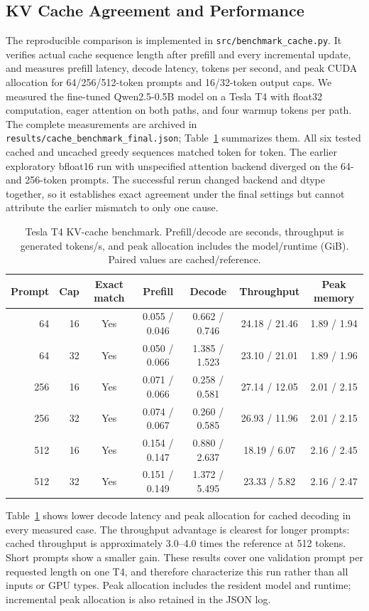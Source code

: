 \documentclass[conference]{IEEEtran}
\begin{document}
\subsection{KV Cache Agreement and Performance}
The reproducible comparison is implemented in \texttt{src/benchmark\_cache.py}. It verifies actual cache sequence length after prefill and every incremental update, and measures prefill latency, decode latency, tokens per second, and peak CUDA allocation for 64/256/512-token prompts and 16/32-token output caps. We measured the fine-tuned Qwen2.5-0.5B model on a Tesla T4 with float32 computation, eager attention on both paths, and four warmup tokens per path. The complete measurements are archived in \texttt{results/cache\_benchmark\_final.json}; Table~\ref{tab:cache-final} summarizes them. All six tested cached and uncached greedy sequences matched token for token. The earlier exploratory bfloat16 run with unspecified attention backend diverged on the 64- and 256-token prompts. The successful rerun changed backend and dtype together, so it establishes exact agreement under the final settings but cannot attribute the earlier mismatch to only one cause.

\begin{table}[t]
\centering
\caption{Tesla T4 KV-cache benchmark. Prefill/decode are seconds, throughput is generated tokens/s, and peak allocation includes the model/runtime (GiB). Paired values are cached/reference.}
\label{tab:cache-final}
\small
\begin{tabular}{rrccccc}
\hline
Prompt & Cap & Exact match & Prefill & Decode & Throughput & Peak memory \\
\hline
64 & 16 & Yes & 0.055 / 0.046 & 0.662 / 0.746 & 24.18 / 21.46 & 1.89 / 1.94 \\
64 & 32 & Yes & 0.050 / 0.066 & 1.385 / 1.523 & 23.10 / 21.01 & 1.89 / 1.96 \\
256 & 16 & Yes & 0.071 / 0.066 & 0.258 / 0.581 & 27.14 / 12.05 & 2.01 / 2.15 \\
256 & 32 & Yes & 0.074 / 0.067 & 0.260 / 0.585 & 26.93 / 11.96 & 2.01 / 2.15 \\
512 & 16 & Yes & 0.154 / 0.147 & 0.880 / 2.637 & 18.19 / 6.07 & 2.16 / 2.45 \\
512 & 32 & Yes & 0.151 / 0.149 & 1.372 / 5.495 & 23.33 / 5.82 & 2.16 / 2.47 \\
\hline
\end{tabular}
\end{table}

Table~\ref{tab:cache-final} shows lower decode latency and peak allocation for cached decoding in every measured case. The throughput advantage is clearest for longer prompts: cached throughput is approximately 3.0--4.0 times the reference at 512 tokens. Short prompts show a smaller gain. These results cover one validation prompt per requested length on one T4, and therefore characterize this run rather than all inputs or GPU types. Peak allocation includes the resident model and runtime; incremental peak allocation is also retained in the JSON log.
\end{document}
